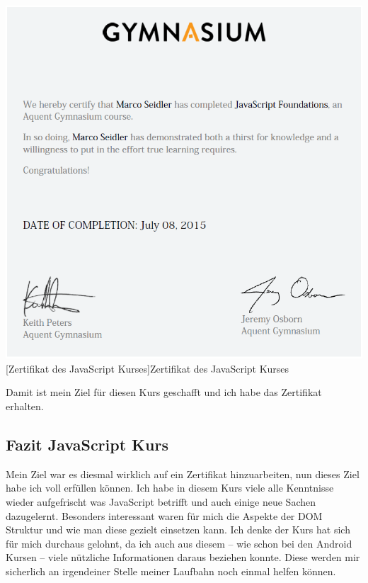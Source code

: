 \documentclass[12pt,a4paper,bibliography=totocnumbered,listof=totocnumbered]{scrartcl}
\begin{document}
\vspace{1em}
\begin{minipage}{\linewidth}
	\centering
	\includegraphics[width=1\linewidth]{Bilder/certificate.png}
	[Zertifikat des JavaScript Kurses]{Zertifikat des JavaScript Kurses \footnotemark }
	\label{fig:osgi}
\end{minipage}

Damit ist mein Ziel für diesen Kurs geschafft und ich habe das Zertifikat erhalten. 
\newpage
\subsection{Fazit JavaScript Kurs}

Mein Ziel war es diesmal wirklich auf ein Zertifikat hinzuarbeiten, nun dieses Ziel habe ich voll erfüllen können. 
Ich habe in diesem Kurs viele alle Kenntnisse wieder aufgefrischt was JavaScript betrifft und auch einige neue Sachen dazugelernt. Besonders interessant waren für mich die Aspekte der DOM Struktur und wie man diese gezielt einsetzen kann. Ich denke der Kurs hat sich für mich durchaus gelohnt, da ich auch aus diesem – wie schon bei den Android Kursen – viele nützliche Informationen daraus beziehen konnte. Diese werden mir sicherlich an irgendeiner Stelle meiner Laufbahn noch einmal helfen können. 
\end{document}
